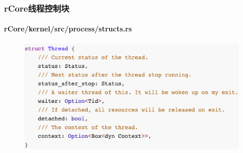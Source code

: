 \begin{frame}[fragile]
    \frametitle{rCore线程控制块}
    \framesubtitle{rCore/kernel/src/process/structs.rs}
    \begin{figure}
    \includegraphics[width=0.9\linewidth]{figs/struct-Thread.png}
    \end{figure}

\end{frame}
% 
% 
% 
% 
% 
